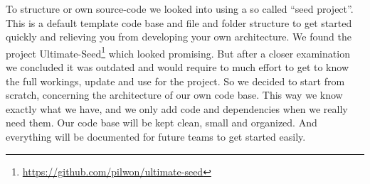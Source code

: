 %

To structure or own \gls{source-code}
we looked into using a so called ``seed project''.
This is a default template code base and file and folder structure
to get started quickly and relieving you from developing your own architecture.
We found the project
Ultimate-Seed\footnote{\url{https://github.com/pilwon/ultimate-seed}}
which looked promising.
But after a closer examination we concluded it was outdated
and would require to much effort to get to know the full workings,
update and use for the \gls{project}.
So we decided to start from scratch,
concerning the architecture of our own code base.
This way we know exactly what we have,
and we only add code and dependencies when we really need them.
Our code base will be kept clean, small and organized.
And everything will be documented for future teams to get started easily.
